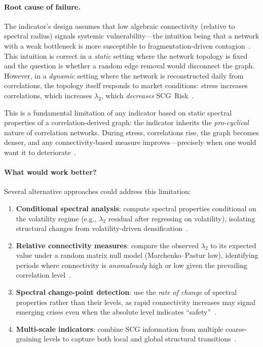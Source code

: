 \paragraph{Root cause of failure.}
The indicator's design assumes that low algebraic connectivity (relative to spectral radius) signals systemic vulnerability---the intuition being that a network with a weak bottleneck is more susceptible to fragmentation-driven contagion~\cite{fiedler1973algebraic}. This intuition is correct in a \emph{static} setting where the network topology is fixed and the question is whether a random edge removal would disconnect the graph. However, in a \emph{dynamic} setting where the network is reconstructed daily from correlations, the topology itself responds to market conditions: stress increases correlations, which increases $\lambda_2$, which \emph{decreases} SCG~Risk~\cite{battiston2009liaisons}.

This is a fundamental limitation of any indicator based on static spectral properties of a correlation-derived graph: the indicator inherits the \emph{pro-cyclical} nature of correlation networks. During stress, correlations rise, the graph becomes denser, and any connectivity-based measure improves---precisely when one would want it to deteriorate~\cite{caccioli2018network}.

\paragraph{What would work better?}
Several alternative approaches could address this limitation:

\begin{enumerate}
    \item \textbf{Conditional spectral analysis}: compute spectral properties conditional on the volatility regime (e.g., $\lambda_2$ residual after regressing on volatility), isolating structural changes from volatility-driven densification~\cite{laloux1999noise}.
    \item \textbf{Relative connectivity measures}: compare the observed $\lambda_2$ to its expected value under a random matrix null model (Marchenko--Pastur law), identifying periods where connectivity is \emph{anomalously} high or low given the prevailing correlation level~\cite{laloux1999noise,tumminello2005tool}.
    \item \textbf{Spectral change-point detection}: use the \emph{rate of change} of spectral properties rather than their levels, as rapid connectivity increases may signal emerging crises even when the absolute level indicates ``safety''~\cite{holme2012temporal}.
    \item \textbf{Multi-scale indicators}: combine SCG information from multiple coarse-graining levels to capture both local and global structural transitions~\cite{villegas2023laplacian,arenas2006synchronization}.
\end{enumerate}

